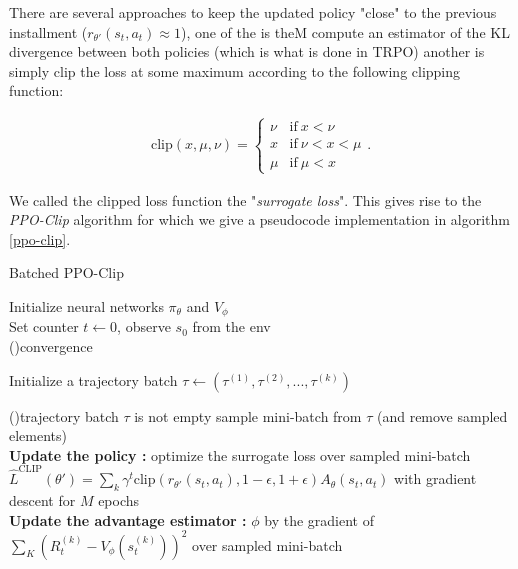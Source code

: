There are several approaches to keep the updated policy "close" to the previous installment ($r_{\theta'}(s_t,a_t) \approx 1$), one of the is theM compute an estimator of the KL divergence between both policies (which is what is done in TRPO) another is simply clip the loss at some maximum according to the following clipping function: 

\begin{align*}
    \text{clip}(x,\mu,\nu) =  
    \begin{cases}
        \nu & \text{if}~x<\nu \\
        x & \text{if}~\nu<x<\mu \\
        \mu & \text{if}~\mu<x 
    \end{cases}.
\end{align*}

We called the clipped loss function the "\textit{surrogate loss}". This gives rise to the \textit{PPO-Clip} algorithm for which we give a pseudocode implementation in algorithm \ref{ppo-clip}.  \\

\begin{algorithm}
    \caption{Batched PPO-Clip}
    \label{batched-ppo-clip}
    Initialize neural networks $\pi_\theta$ and $V_\phi$ \\
    Set counter $t \leftarrow 0$, observe $s_0$ from the env \\
    \Repeat(){convergence}{
        Initialize a trajectory batch $\tau \leftarrow (\tau^{(1)},\tau^{(2)},...,\tau^{(k)})$\\
        
        \While(){trajectory batch $\tau$ is not empty}{
            sample mini-batch from $\tau$ (and remove sampled elements) \\
            \textbf{Update the policy :} optimize the surrogate loss over sampled mini-batch $\hat{L}^\text{CLIP}(\theta') = \sum_{k} \gamma^t \text{clip}(r_{\theta'}(s_t,a_t),1-\epsilon,1+\epsilon) A_\theta(s_t,a_t)$ with gradient descent for $M$ epochs\\
            \textbf{Update the advantage estimator :} $\phi$ by the gradient of $\sum_K (R_t^{(k)} - V_\phi(s_t^(k)))^2$ over sampled mini-batch
        }
    }
\end{algorithm}

